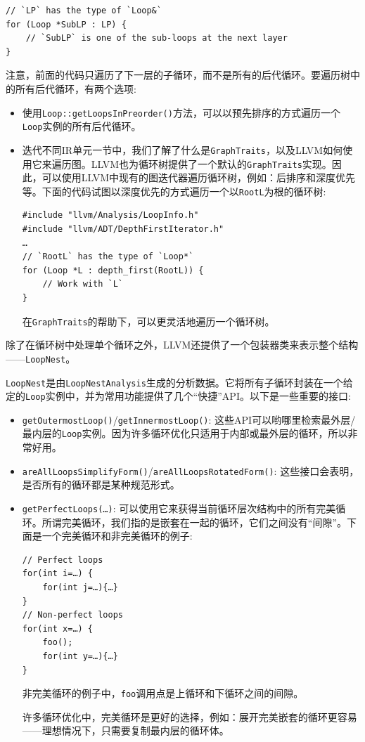 \begin{lstlisting}[style=styleCXX]
// `LP` has the type of `Loop&`
for (Loop *SubLP : LP) {
	// `SubLP` is one of the sub-loops at the next layer
}
\end{lstlisting}

注意，前面的代码只遍历了下一层的子循环，而不是所有的后代循环。要遍历树中的所有后代循环，有两个选项:

\begin{itemize}
\item 使用\texttt{Loop::getLoopsInPreorder()}方法，可以以预先排序的方式遍历一个\texttt{Loop}实例的所有后代循环。

\item 迭代不同IR单元一节中，我们了解了什么是\texttt{GraphTraits}，以及LLVM如何使用它来遍历图。LLVM也为循环树提供了一个默认的\texttt{GraphTraits}实现。因此，可以使用LLVM中现有的图迭代器遍历循环树，例如：后排序和深度优先等。下面的代码试图以深度优先的方式遍历一个以\texttt{RootL}为根的循环树:

\begin{lstlisting}[style=styleCXX]
#include "llvm/Analysis/LoopInfo.h"
#include "llvm/ADT/DepthFirstIterator.h"
…
// `RootL` has the type of `Loop*`
for (Loop *L : depth_first(RootL)) {
	// Work with `L`
}
\end{lstlisting}

在\texttt{GraphTraits}的帮助下，可以更灵活地遍历一个循环树。

\end{itemize}

除了在循环树中处理单个循环之外，LLVM还提供了一个包装器类来表示整个结构——\texttt{LoopNest}。 

\texttt{LoopNest}是由\texttt{LoopNestAnalysis}生成的分析数据。它将所有子循环封装在一个给定的\texttt{Loop}实例中，并为常用功能提供了几个“快捷”API。以下是一些重要的接口:

\begin{itemize}
\item \texttt{getOutermostLoop()}/\texttt{getInnermostLoop()}: 这些API可以哟哪里检索最外层/最内层的\texttt{Loop}实例。因为许多循环优化只适用于内部或最外层的循环，所以非常好用。

\item \texttt{areAllLoopsSimplifyForm()}/\texttt{areAllLoopsRotatedForm()}: 这些接口会表明，是否所有的循环都是某种规范形式。

\item \texttt{getPerfectLoops(…)}: 可以使用它来获得当前循环层次结构中的所有完美循环。所谓完美循环，我们指的是嵌套在一起的循环，它们之间没有“间隙”。下面是一个完美循环和非完美循环的例子:

\begin{lstlisting}[style=styleCXX]
// Perfect loops
for(int i=…) {
	for(int j=…){…}
}
// Non-perfect loops
for(int x=…) {
	foo();
	for(int y=…){…}
}
\end{lstlisting}

非完美循环的例子中，\texttt{foo}调用点是上循环和下循环之间的间隙。

许多循环优化中，完美循环是更好的选择，例如：展开完美嵌套的循环更容易——理想情况下，只需要复制最内层的循环体。

\end{itemize}

